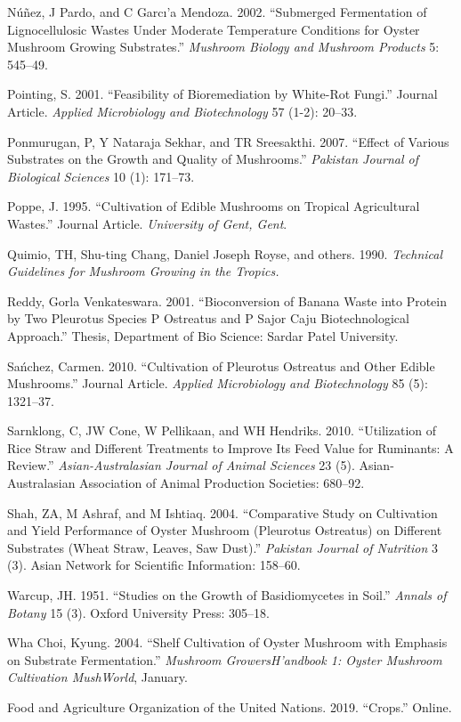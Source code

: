\documentclass[]{article}
\DeclareRobustCommand{\firstsecond}[2]{#2}
\begin{document}
\leavevmode\hypertarget{ref-nunez2002submerged}{}%
Núñez, J Pardo, and C Garcı'a Mendoza. 2002. ``Submerged Fermentation of Lignocellulosic Wastes Under Moderate Temperature Conditions for Oyster Mushroom Growing Substrates.'' \emph{Mushroom Biology and Mushroom Products} 5: 545--49.

\leavevmode\hypertarget{ref-pointing2001}{}%
Pointing, S. 2001. ``Feasibility of Bioremediation by White-Rot Fungi.'' Journal Article. \emph{Applied Microbiology and Biotechnology} 57 (1-2): 20--33.

\leavevmode\hypertarget{ref-ponmurugan2007effect}{}%
Ponmurugan, P, Y Nataraja Sekhar, and TR Sreesakthi. 2007. ``Effect of Various Substrates on the Growth and Quality of Mushrooms.'' \emph{Pakistan Journal of Biological Sciences} 10 (1): 171--73.

\leavevmode\hypertarget{ref-poppe1995}{}%
Poppe, J. 1995. ``Cultivation of Edible Mushrooms on Tropical Agricultural Wastes.'' Journal Article. \emph{University of Gent, Gent}.

\leavevmode\hypertarget{ref-quimio1990technical}{}%
Quimio, TH, Shu-ting Chang, Daniel Joseph Royse, and others. 1990. \emph{Technical Guidelines for Mushroom Growing in the Tropics.}

\leavevmode\hypertarget{ref-reddy2001bioconversion}{}%
Reddy, Gorla Venkateswara. 2001. ``Bioconversion of Banana Waste into Protein by Two Pleurotus Species P Ostreatus and P Sajor Caju Biotechnological Approach.'' Thesis, Department of Bio Science: Sardar Patel University.

\leavevmode\hypertarget{ref-sanchez2010cultivation}{}%
Sańchez, Carmen. 2010. ``Cultivation of Pleurotus Ostreatus and Other Edible Mushrooms.'' Journal Article. \emph{Applied Microbiology and Biotechnology} 85 (5): 1321--37.

\leavevmode\hypertarget{ref-sarnklong2010utilization}{}%
Sarnklong, C, JW Cone, W Pellikaan, and WH Hendriks. 2010. ``Utilization of Rice Straw and Different Treatments to Improve Its Feed Value for Ruminants: A Review.'' \emph{Asian-Australasian Journal of Animal Sciences} 23 (5). Asian-Australasian Association of Animal Production Societies: 680--92.

\leavevmode\hypertarget{ref-shah2004comparative}{}%
Shah, ZA, M Ashraf, and M Ishtiaq. 2004. ``Comparative Study on Cultivation and Yield Performance of Oyster Mushroom (Pleurotus Ostreatus) on Different Substrates (Wheat Straw, Leaves, Saw Dust).'' \emph{Pakistan Journal of Nutrition} 3 (3). Asian Network for Scientific Information: 158--60.

\leavevmode\hypertarget{ref-warcup1951studies}{}%
Warcup, JH. 1951. ``Studies on the Growth of Basidiomycetes in Soil.'' \emph{Annals of Botany} 15 (3). Oxford University Press: 305--18.

\leavevmode\hypertarget{ref-kyung2004shelfcultivation}{}%
Wha Choi, Kyung. 2004. ``Shelf Cultivation of Oyster Mushroom with Emphasis on Substrate Fermentation.'' \emph{Mushroom GrowersH'andbook 1: Oyster Mushroom Cultivation MushWorld}, January.

\leavevmode\hypertarget{ref-fao2019crops}{}%
\firstsecond{FAO}{Food and Agriculture Organization of the United Nations}. 2019. ``Crops.'' Online.
\end{document}
